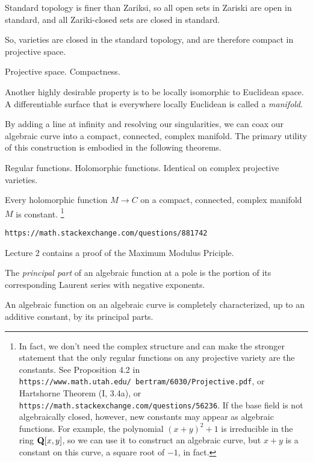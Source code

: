 Standard topology is finer than Zariksi, so all open sets in Zariski
are open in standard, and all Zariki-closed sets are closed in standard.

So, varieties are closed in the standard topology, and are therefore
compact in projective space.



Projective space.  Compactness.

Another highly desirable property is to be locally isomorphic to
Euclidean space.  A differentiable surface that is everywhere locally
Euclidean is called a {\it manifold}.

By adding a line at infinity and resolving our singularities, we can
coax our algebraic curve into a compact, connected, complex manifold.
The primary utility of this construction is embodied in the following
theorems.

Regular functions.  Holomorphic functions.  Identical on complex
projective varieties.

\theorem
\label{holomorphic functions on compact manifolds are constant}

Every holomorphic function $M \to C$ on a compact, connected, complex manifold $M$ is constant.
\footnote{
In fact, we don't need the complex structure and can make the stronger
statement that the only regular functions on any projective variety are the constants.
See Proposition 4.2 in
{\tt https://www.math.utah.edu/~bertram/6030/Projective.pdf},
or Hartshorne Theorem (I, 3.4a),
or {\tt https://math.stackexchange.com/questions/56236}.
If the base field is not algebraically closed, however,
new constants may appear as algebraic functions.
For example, the polynomial $(x+y)^2+1$ is
irreducible in the ring $\mathbf{Q}[x,y]$, so we can use it to construct
an algebraic curve, but $x+y$ is a constant on this
curve, a square root of $-1$, in fact.
}

\proof

{\tt https://math.stackexchange.com/questions/881742}

\cite{guillemin} Lecture 2 contains a proof of the Maximum Modulus Priciple.

\endtheorem

The {\it principal part} of an algebraic function at a pole is the
portion of its corresponding Laurent series with negative exponents.
\enddefinition

\theorem
\label{algebraic functions are characterized by their principal parts}

An algebraic function on an algebraic curve is completely characterized, up to an additive
constant, by its principal parts.

